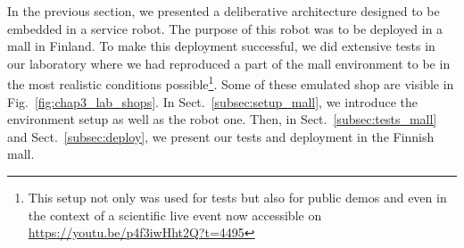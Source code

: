 \documentclass[a4paper,11pt,twoside]{StyleThese}
\begin{document}
In the previous section, we presented a deliberative architecture designed to be embedded in a service robot. The purpose of this robot was to be deployed in a mall in Finland. 
To make this deployment successful, we did extensive tests in our laboratory where we had reproduced a part of the mall environment to be in the most realistic conditions possible\footnote{This setup not only was used for tests but also for public demos and even in the context of a scientific live event now accessible on \url{https://youtu.be/p4f3iwHht2Q?t=4495}}. Some of these emulated shop are visible in Fig.~\ref{fig:chap3_lab_shops}. 
In Sect.~\ref{subsec:setup_mall}, we introduce the environment setup as well as the robot one. Then, in Sect.~\ref{subsec:tests_mall} and Sect.~\ref{subsec:deploy}, we present our tests and deployment in the Finnish mall. 
\end{document}
